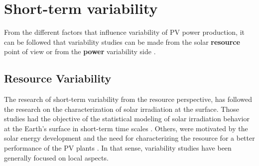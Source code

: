 \section{Short-term variability}%


From the different factors that influence variability of PV power production, it can be followed that variability studies can be made from the solar \textbf{resource} point of view or from the \textbf{power} variability side \cite*{Widen2015}.

\subsection{Resource Variability}


The research of short-term variability from the resource perspective, has followed the research on the characterization of solar irradiation at the surface. Those studies had the objective of the statistical modeling of solar irradiation behavior at the Earth's surface in short-term time scales \cite*{Liu1960}. Others, were motivated by the solar energy development and the need for characterizing the resource for a better performance of the PV plants \cite*{Collares-Pereira1979}. In that sense, variability studies have been generally focused on local aspects.

